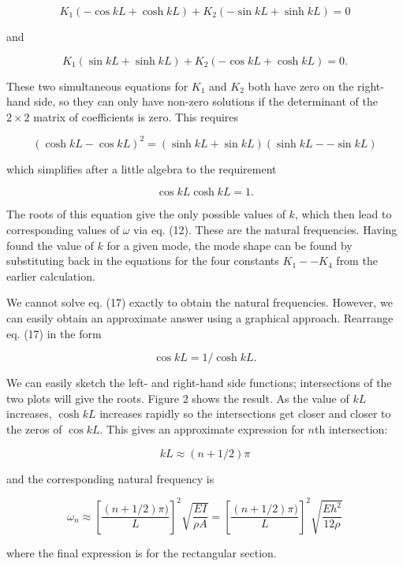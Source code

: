   $$K_1 (-\cos kL +\cosh kL) +K_2 (-\sin kL +\sinh kL)=0 \tag{14}$$ 

  and 

  $$K_1 (\sin kL +\sinh kL) + K_2(-\cos kL +\cosh kL)=0. \tag{15}$$ 

  These two simultaneous equations for $K_1$ and $K_2$ both have zero on the 
  right-hand side, so they can only have non-zero solutions if the determinant 
  of the $2 \times 2$ matrix of coefficients is zero. This requires 

  $$(\cosh kL -\cos kL)^2 = (\sinh kL + \sin kL)(\sinh kL -- \sin kL) 
  \tag{16}$$ 

  which simplifies after a little algebra to the requirement 

  $$\cos kL \cosh kL =1. \tag{17}$$ 

  The roots of this equation give the only possible values of $k$, which then 
  lead to corresponding values of $\omega$ via eq. (12). These are the natural 
  frequencies. Having found the value of $k$ for a given mode, the mode shape 
  can be found by substituting back in the equations for the four constants 
  $K_1 -- K_4$ from the earlier calculation. 

  We cannot solve eq. (17) exactly to obtain the natural frequencies. However, 
  we can easily obtain an approximate answer using a graphical approach. 
  Rearrange eq. (17) in the form 

  $$\cos kL =1/\cosh kL. \tag{18}$$ 

  We can easily sketch the left- and right-hand side functions; intersections 
  of the two plots will give the roots. Figure 2 shows the result. As the value 
  of $kL$ increases, $\cosh kL$ increases rapidly so the intersections get 
  closer and closer to the zeros of $\cos kL$. This gives an approximate 
  expression for $n$th intersection: 

  $$kL \approx (n +1/2) \pi \tag{19}$$ 

  and the corresponding natural frequency is 

  $$\omega_n \approx \left[ \dfrac{(n+1/2)\pi)}{L}\right]^2 
  \sqrt{\dfrac{EI}{\rho A}} = \left[ \dfrac{(n+1/2)\pi)}{L}\right]^2 
  \sqrt{\dfrac{Eh^2}{12 \rho}} \tag{20}$$ 

  where the final expression is for the rectangular section. 